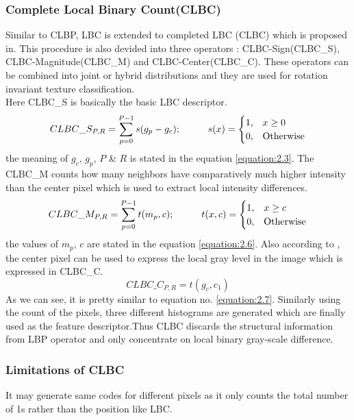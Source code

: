 \documentclass[12pt]{article}
\newcommand\tab[1][1cm]{\hspace*{#1}}
\begin{document}
\subsubsection{Complete Local Binary Count(CLBC)}
Similar to CLBP,  LBC is extended to completed
LBC (CLBC) which is proposed in\cite{clbc01}. This procedure is also devided into three operators :  CLBC-Sign(CLBC\_S), CLBC-Magnitude(CLBC\_M) and   CLBC-Center(CLBC\_C). These operators can be combined into joint or hybrid distributions and they are used for rotation invariant texture classification.\\
\linebreak
Here CLBC\_S is basically the basic LBC descriptor. 
\begin{equation}
CLBC\_S_{P,R}=\sum\limits_{p=0}^{P-1}{s({{g}_{p}}-{{g}_{c}})}; \tab  s(x)= 
\begin{cases}
1,&  x\geq 0\\
0,&  \text{Otherwise}
\end{cases}
\label{equation:2.10}
\end{equation}
the meaning of $g_c$, $g_p$, $P$ \& $R$ is stated in the equation \ref{equation:2.3}. The CLBC\_M counts how
many neighbors have comparatively much higher intensity than the
center pixel which is used to extract local intensity differences.
\begin{equation}
CLBC\_M_{P,R}=\sum\limits_{p=0}^{P-1}{t(m_p,c)}; \tab  t(x,c)= 
\begin{cases}
1,&  x\geq c\\
0,&  \text{Otherwise}
\end{cases}
\label{equation:2.11}
\end{equation}
the values of $m_p$, $c$ are stated in the equation \ref{equation:2.6}. Also according to \cite{enhancedLTP1}, the center pixel can be used to express the local gray level in the image which is expressed in CLBC\_C.
\begin{equation}
CLBC\_C_{P,R} = t(g_c,c_1)
\label{equation:2.12}
\end{equation}
As we can see, it is pretty similar to equation no. \ref{equation:2.7}. Similarly using the count of the pixels, three different histograms are generated which are finally used as the feature descriptor.Thus CLBC discards the structural information from LBP operator and only concentrate on local binary gray-scale difference.

\subsubsection*{Limitations of CLBC}
It may generate same codes for different pixels as it only counts the total number of 1s rather than the position like LBC.\\%
\end{document}
